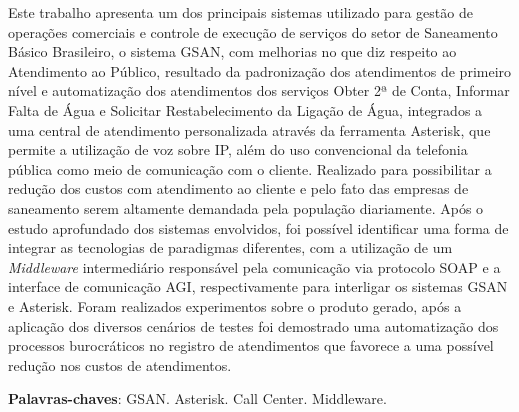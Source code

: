 \setlength{\absparsep}{18pt} %
\begin{resumo}
 
Este trabalho apresenta um dos principais sistemas utilizado para gestão de operações comerciais e controle de execução de serviços do setor de Saneamento Básico Brasileiro, o sistema GSAN, com melhorias no que diz respeito ao Atendimento ao Público, resultado da padronização dos atendimentos de primeiro nível e automatização dos atendimentos dos serviços Obter 2ª de Conta, Informar Falta de Água e Solicitar Restabelecimento da Ligação de Água, integrados a uma central de atendimento personalizada através da ferramenta Asterisk, que permite a utilização de voz sobre IP, além do uso convencional da telefonia pública como meio de comunicação com o cliente. Realizado para possibilitar a redução dos custos com atendimento ao cliente e pelo fato das empresas de saneamento serem altamente demandada pela população diariamente. Após o estudo aprofundado dos sistemas envolvidos, foi possível identificar uma forma de integrar as tecnologias de paradigmas diferentes, com a utilização de um \textit{Middleware} intermediário responsável pela comunicação via protocolo SOAP e a interface de comunicação AGI, respectivamente para interligar os sistemas GSAN e Asterisk.  Foram realizados experimentos sobre o produto gerado, após a aplicação dos diversos cenários de testes foi demostrado uma automatização dos processos burocráticos no registro de atendimentos que favorece a uma possível redução nos custos de atendimentos.


 \textbf{Palavras-chaves}: GSAN. Asterisk. Call Center. Middleware.
\end{resumo}